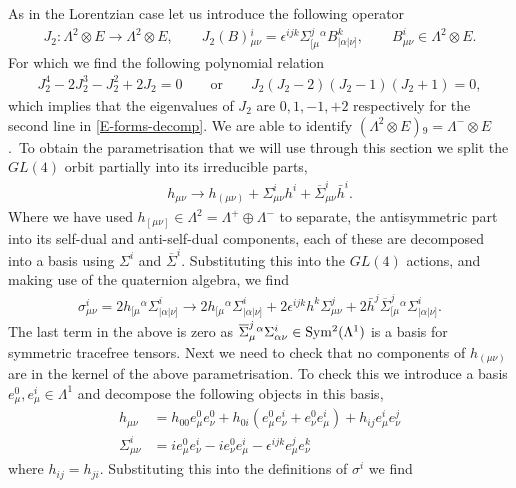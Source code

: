 \documentclass[10pt]{report}
\theoremstyle{definition}
\newcommand{\asd}[0]{\overline{\Sigma}}
\begin{document}
As in the Lorentzian case let us introduce the following operator
\begin{align}\label{J2}
J_2: \Lambda^2\otimes E\to \Lambda^2\otimes E, \qquad J_2(B){}_{\mu\nu}^i = \epsilon^{ijk} \Sigma^j_{[\mu}{}^\alpha B_{|\alpha|\nu]}^k, \qquad B_{\mu\nu}^i\in \Lambda^2\otimes E.
\end{align}
For which we find the following polynomial relation
\begin{align}
J_2^4 - 2J_2^3-J_2^2 + 2 J_2=0 \qquad \text{or} \qquad J_2 (J_2-2)(J_2-1)(J_2+1)=0,
\end{align}
which implies that the eigenvalues of $J_2$ are $0,1,-1,+2$ respectively for the second line in \cref{E-forms-decomp}. We are able to identify $(\Lambda^2\otimes E){}_9 = \Lambda^-\otimes E$.~To obtain the parametrisation that we will use through this section we split the $GL(4)$ orbit partially into its irreducible parts,
\begin{align}
    h_{\mu\nu} \rightarrow h_{(\mu\nu)} +  \Sigma^i_{\mu\nu} h^i + \asd^i_{\mu\nu} \bar{h}^i.
\end{align}
Where we have used $h_{[\mu\nu]} \in \Lambda^2 = \Lambda^+ \oplus \Lambda^-$ to separate, the antisymmetric part into its self-dual and anti-self-dual components, each of these are decomposed into a basis using $\Sigma^i$ and $\asd^i$. Substituting this into the $GL(4)$ actions, and making use of the quaternion algebra, we find
\begin{align}
    \sigma^i_{\mu\nu} = 2 h_{[\mu}{}^\alpha \Sigma^i_{|\alpha|\nu]} \rightarrow 2 h_{[\mu}{}^\alpha \Sigma^i_{|\alpha|\nu]} + 2 \epsilon^{ijk} h^k \Sigma^j_{\mu\nu} + 2 \bar{h}^j \asd^j_{[\mu}{}^\alpha \Sigma^i_{|\alpha|\nu]}.
\end{align}
The last term in the above is zero as $\asd^j_{\mu}{}^\alpha \Sigma^i_{\alpha\nu} \in \rm Sym^2(\Lambda^1)$ is a basis for symmetric tracefree tensors. Next we need to check that no components of $h_{(\mu\nu)}$ are in the kernel of the above parametrisation. To check this we introduce a basis $e^0_\mu, e^i_\mu \in \Lambda^1$ and decompose the following objects in this basis,
\begin{align}
    h_{\mu\nu} & = h_{00} e^0_\mu e^0_\nu + h_{0i} (e^0_\mu e^i_\nu + e^0_\nu e^i_\mu) + h_{ij} e^i_\mu e^j_\nu \\
    \Sigma^i_{\mu\nu} & = i e^0_\mu e^i_\nu - i e^0_\nu e^i_\mu - \epsilon^{ijk} e^j_\mu e^k_\nu
\end{align}
where $h_{ij} = h_{ji}$. Substituting this into the definitions of $\sigma^i$ we find
\end{document}
